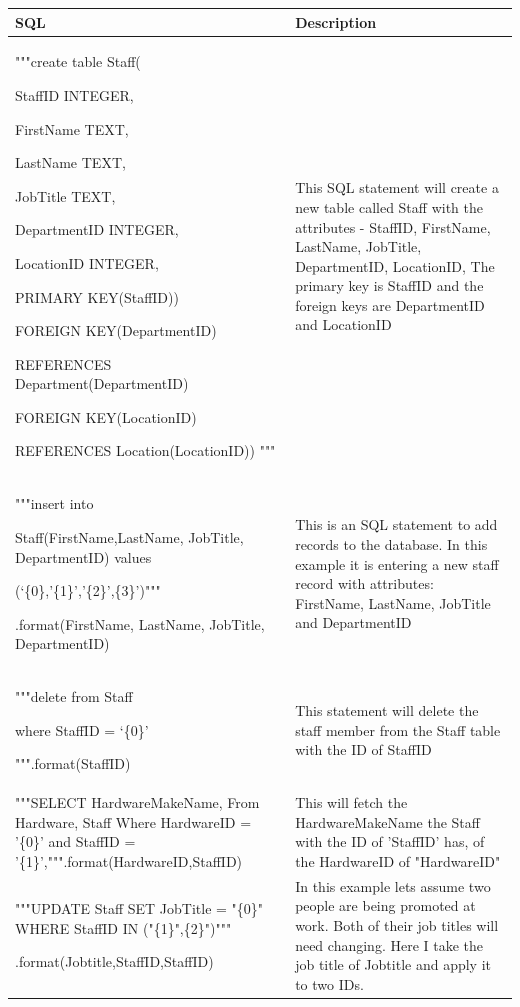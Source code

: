 \begin{center}
\begin{tabular}{|p{6cm}|p{5cm}|}
\hline
\textbf{SQL}      & \textbf{Description} \\ \hline
"""create table Staff(\

   StaffID INTEGER,\

   FirstName TEXT,\

   LastName TEXT,\

   JobTitle TEXT,\

   DepartmentID INTEGER,\

   LocationID INTEGER,\

   PRIMARY KEY(StaffID))\

   FOREIGN KEY(DepartmentID) \

   REFERENCES Department(DepartmentID)\

   FOREIGN KEY(LocationID) \

   REFERENCES Location(LocationID)) """                         & This SQL statement will create a new table called Staff with the attributes - StaffID, FirstName, LastName, JobTitle, DepartmentID, LocationID, The primary key is StaffID and the foreign keys are DepartmentID and LocationID                       \\ \hline

"""insert into\

Staff(FirstName,LastName, JobTitle, DepartmentID) values\

(‘\{0\},’\{1\}’,’\{2\}’,\{3\}')"""

.format(FirstName, LastName, JobTitle, DepartmentID)					 & This is an SQL statement to add records to the database. In this example it is entering a new staff record with attributes: FirstName, LastName, JobTitle and DepartmentID \\ \hline

"""delete from Staff\

where StaffID = ‘\{0\}’\

""".format(StaffID) & This statement will delete the staff member from the Staff table with the ID of StaffID \\ \hline

"""SELECT HardwareMakeName,
From Hardware, Staff
Where HardwareID = '\{0\}' and StaffID = '\{1\}',""".format(HardwareID,StaffID) & This will fetch the HardwareMakeName the Staff with the ID of 'StaffID' has, of the HardwareID of "HardwareID" \\ \hline

"""UPDATE Staff
	SET JobTitle = "\{0\}"
	WHERE StaffID IN ("\{1\}",\{2\}")"""

.format(Jobtitle,StaffID,StaffID) & In this example lets assume two people are being promoted at work. Both of their job titles will need changing. Here I take the job title of Jobtitle and apply it to two IDs.\\ \hline

\end{tabular}
\end{center}

